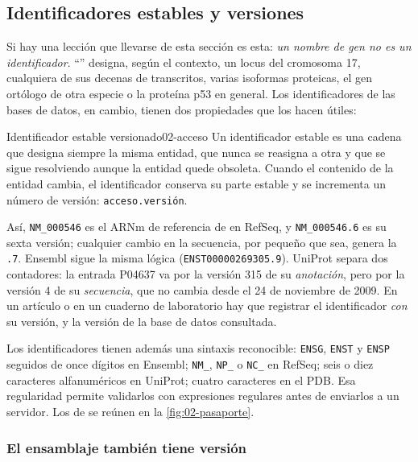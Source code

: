 \subsection{Identificadores estables y versiones}

Si hay una lección que llevarse de esta sección es esta: \emph{un nombre de gen no es un identificador}. ``'' designa, según el contexto, un locus del cromosoma 17, cualquiera de sus decenas de transcritos, varias isoformas proteicas, el gen ortólogo de otra especie o la proteína p53 en general. Los identificadores de las bases de datos, en cambio, tienen dos propiedades que los hacen útiles:

\begin{definicion}{Identificador estable versionado}{02-acceso}
Un identificador estable es una cadena que designa siempre la misma entidad, que nunca se reasigna a otra y que se sigue resolviendo aunque la entidad quede obsoleta. Cuando el contenido de la entidad cambia, el identificador conserva su parte estable y se incrementa un número de versión: \texttt{acceso.versión}.
\end{definicion}

Así, \texttt{NM\_000546} es el ARNm de referencia de  en RefSeq, y \texttt{NM\_000546.6} es su sexta versión; cualquier cambio en la secuencia, por pequeño que sea, genera la \texttt{.7}. Ensembl sigue la misma lógica (\texttt{ENST00000269305.9}). UniProt separa dos contadores: la entrada P04637 va por la versión 315 de su \emph{anotación}, pero por la versión 4 de su \emph{secuencia}, que no cambia desde el 24 de noviembre de 2009. En un artículo o en un cuaderno de laboratorio hay que registrar el identificador \emph{con} su versión, y la versión de la base de datos consultada.

Los identificadores tienen además una sintaxis reconocible: \texttt{ENSG}, \texttt{ENST} y \texttt{ENSP} seguidos de once dígitos en Ensembl; \texttt{NM\_}, \texttt{NP\_} o \texttt{NC\_} en RefSeq; seis o diez caracteres alfanuméricos en UniProt; cuatro caracteres en el PDB. Esa regularidad permite validarlos con expresiones regulares antes de enviarlos a un servidor. Los de  se reúnen en la \cref{fig:02-pasaporte}.



\subsubsection{El ensamblaje también tiene versión}

